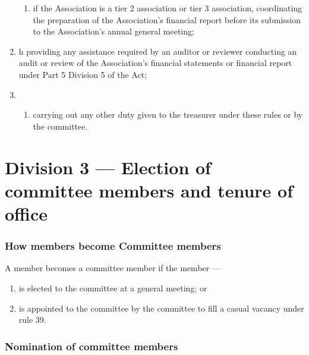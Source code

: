 \begin{enumerate}
\begin{enumerate}
  \item if the Association is a tier 2 association or tier 3 association, coordinating the preparation of the Association's financial report before its submission to the Association's annual general meeting;
  \end{enumerate}
\item h providing any assistance required by an auditor or reviewer conducting an audit or review of the Association's financial statements or financial report under Part 5 Division 5 of the Act;
\item \begin{enumerate}
  \def\labelenumi{\roman{enumi})}
  
  \item carrying out any other duty given to the treasurer under these rules or by the committee.
  \end{enumerate}
\end{enumerate}

\hypertarget{division-3-election-of-committee-members-and-tenure-of-office}{%
\part*{Division 3 --- Election of committee members and tenure of office}\label{division-3-election-of-committee-members-and-tenure-of-office}}

\hypertarget{how-members-become-committee-members}{%
\section{How members become Committee members}\label{how-members-become-committee-members}}

A member becomes a committee member if the member ---

\begin{enumerate}

\item is elected to the committee at a general meeting; or
\item is appointed to the committee by the committee to fill a casual vacancy under rule 39.
\end{enumerate}

\hypertarget{nomination-of-committee-members}{%
\section{Nomination of committee members}\label{nomination-of-committee-members}}


